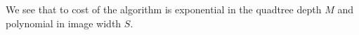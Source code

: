 We see that to cost of the algorithm is exponential in the quadtree depth $M$
and polynomial in image width $S$.









